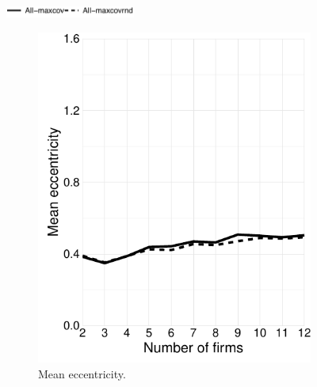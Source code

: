\documentclass[preprint, 12pt]{elsarticle}
\begin{document}
\begin{figure}[ht!]
	\centering
	\caption{Estimates from market with symmetric and unimodal distribution of consumers ($\mu = 0$ and $n_l/n_r = 1$). Solid lines is \emph{maxcov} model and the dashed line is the \emph{maxcovrnd} model.}
	\includegraphics[width=42.5mm]{Graphics/legend_maxcovrnd.pdf}

	\begin{subfigure}[t]{0.315\textwidth}
		\centering
		\includegraphics[width=\textwidth, trim={4mm 0 0 0}]{Graphics/figA11.pdf}
		\caption{Mean eccentricity.}
		\label{fig:eccentricity_maxcovrnd}
	\end{subfigure}
	~
	\begin{subfigure}[t]{0.315\textwidth}
		\centering

\end{subfigure}
\end{figure}
\end{document}
